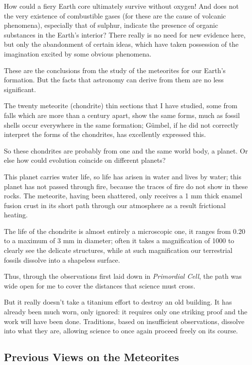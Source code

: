 \documentclass[a4paper, 12pt, oneside]{article}
\begin{document}
How could a fiery Earth core ultimately survive without oxygen! And does not the very existence of combustible gases (for these are the cause of volcanic phenomena), especially that of sulphur, indicate the presence of organic substances in the Earth's interior? There really is no need for new evidence here, but only the abandonment of certain ideas, which have taken possession of the imagination excited by some obvious phenomena.

These are the conclusions from the study of the meteorites for our Earth's formation. But the facts that astronomy can derive from them are no less significant.

The twenty meteorite (chondrite) thin sections that I have studied, some from falls which are more than a century apart, show the same forms, much as fossil shells occur everywhere in the same formation; Gümbel, if he did not correctly interpret the forms of the chondrites, has excellently expressed this.

So these chondrites are probably from one and the same world body, a planet. Or else how could evolution coincide on different planets?

This planet carries water life, so life has arisen in water and lives by water; this planet has not passed through fire, because the traces of fire do not show in these rocks. The meteorite, having been shattered, only receives a 1 mm thick enamel fusion crust in its short path through our atmosphere as a result frictional heating.

The life of the chondrite is almost entirely a microscopic one, it ranges from 0.20 to a maximum of 3 mm in diameter; often it takes a magnification of 1000 to clearly see the delicate structures, while at such magnification our terrestrial fossils dissolve into a shapeless surface.

Thus, through the observations first laid down in \emph{Primordial Cell}, the path was wide open for me to cover the distances that science must cross.

But it really doesn't take a titanium effort to destroy an old building. It has already been much worn, only ignored: it requires only one striking proof and the work will have been done. Traditions, based on insufficient observations, dissolve into what they are, allowing science to once again proceed freely on its course.
\clearpage
\subsection{Previous Views on the Meteorites}
\end{document}
